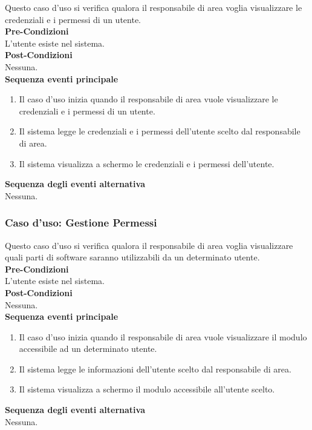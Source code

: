 \documentclass[green, fancy, 11pt]{elegantbook}
\begin{document}
Questo caso d’uso si verifica qualora il responsabile di area voglia visualizzare le credenziali e i permessi di un utente.\\
\textbf{Pre-Condizioni}\\
L’utente esiste nel sistema.\\
\textbf{Post-Condizioni}\\
Nessuna.\\
\textbf{Sequenza eventi principale}\\
\begin{enumerate}
	\item Il caso d’uso inizia quando il responsabile di area vuole visualizzare le credenziali e i permessi di un utente.
	\item Il sistema legge le credenziali e i permessi dell’utente scelto dal responsabile di area.
	\item Il sistema visualizza a schermo le credenziali e i permessi dell’utente.
\end{enumerate}
\textbf{Sequenza degli eventi alternativa}\\
Nessuna.

\subsubsection{Caso d'uso: Gestione Permessi}

Questo caso d’uso si verifica qualora il responsabile di area voglia visualizzare quali parti di software saranno utilizzabili da un determinato utente.\\
\textbf{Pre-Condizioni}\\
L'utente esiste nel sistema.\\
\textbf{Post-Condizioni}\\
Nessuna.\\
\textbf{Sequenza eventi principale}\\
\begin{enumerate}
	\item Il caso d’uso inizia quando il responsabile di area vuole visualizzare il modulo accessibile ad un determinato utente.
	\item Il sistema legge le informazioni dell’utente scelto dal responsabile di area.
	\item Il sistema visualizza a schermo il modulo accessibile all’utente scelto.
\end{enumerate}
\textbf{Sequenza degli eventi alternativa}\\
Nessuna.
\end{document}
